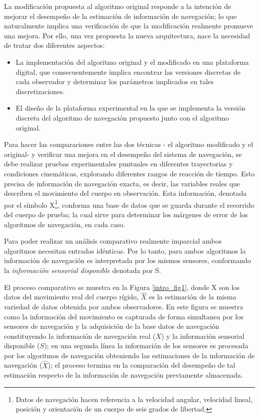 \documentclass[10pt]{report}
\numberwithin{equation}{chapter}
\numberwithin{algorithm}{chapter}
\begin{document}
La modificación propuesta al algoritmo original responde a la intención de mejorar el desempeño de la estimación de información de navegación; lo que naturalmente implica una verificación de que la modificación realmente promueve una mejora. Por ello, una vez propuesta la nueva arquitectura, nace la necesidad de tratar dos diferentes aspectos:
\begin{itemize}
\item La implementación del algoritmo original y el modificado en una plataforma digital, que consecuentemente implica encontrar las versiones discretas de cada observador y determinar los parámetros implicados en tales discretizaciones.
\item El diseño de la plataforma experimental en la que se implementa la versión discreta del algoritmo de navegación propuesto junto con el algoritmo original.
\end{itemize}
Para hacer las comparaciones entre las dos técnicas - el algoritmo modificado y el original- y verificar una mejora en el desempeño del sistema de navegación, se debe realizar pruebas experimentales puntuales en diferentes trayectorias y condiciones cinemáticas, explorando diferentes rangos de reacción de tiempo. Esto precisa de información de navegación exacta, es decir, las variables reales que describen el movimiento del cuerpo en observación. Esta información, denotada por el símbolo X\footnote{Datos de navegación hacen referencia a la velocidad angular, velocidad lineal, posición y orientación de un cuerpo de seis grados de libertad.}, conforma una base de datos que se guarda durante el recorrido del cuerpo de prueba; la cual sirve para determinar los márgenes de error de los algoritmos de navegación, en cada caso.\par
Para poder realizar un análisis comparativo realmente imparcial ambos algoritmos necesitan entradas idénticas. Por lo tanto, para ambos algoritmos la información de navegación es interpretada por los mismos sensores, conformando la \emph{información sensorial disponible} denotada por S.\par
El proceso comparativo se muestra en la Figura \ref{intro_fig1}, donde X son los datos del movimiento real del cuerpo rígido, $\hat{X}$ es la estimación de la misma variedad de datos obtenida por ambos observadores. En este figura se muestra como la información del movimiento es capturada de forma simultanea por los sensores de navegación y la adquisición de la base datos de navegación constituyendo la información de navegación real ($X$) y la información sensorial disponible ($S$); en una segunda línea la información de los sensores es procesada por los algoritmos de navegación obteniendo las estimaciones de la información de navegación ($\hat{X}$); el proceso termina en la comparación del desempeño de tal estimación respecto de la información de navegación previamente almacenada.\par
\end{document}
